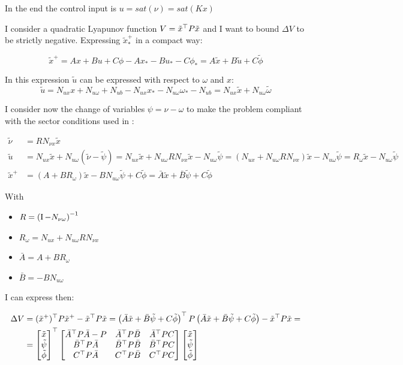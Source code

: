 \documentclass{article}
\begin{document}
In the end the control input is $u = sat(\nu) = sat(K x)$

I consider a quadratic Lyapunov function $V = \tilde{x}^\top P \tilde{x}$ and I want to bound $\Delta V$ to be strictly negative.
Expressing $\tilde{x}_*^{+}$ in a compact way:

$$
  \tilde{x}^{+} = A x + B u + C \phi - A x_* - B u_* - C \phi_* = A \tilde{x} + B \tilde{u} + C \tilde{\phi}
$$

In this expression $\tilde{u}$ can be expressed with respect to $\omega$ and $x$:
$$
  \tilde{u} = N_{ux} x + N_{u \omega} + N_{ub} - N_{ux} x_* - N_{u \omega} \omega_* - N_{ub} = N_{ux} \tilde{x} + N_{u \omega} \tilde{\omega}
$$

I consider now the change of variables $\psi = \nu - \omega$ to make the problem compliant with the sector conditions used in \cite{css-extended}:

\begin{align*}
  \tilde{\nu} &= R N_{\nu x} \tilde{x} \\
  \tilde{u} &= N_{ux} \tilde{x} + N_{u \omega} (\tilde{\nu} - \tilde{\psi}) = N_{ux} \tilde{x} + N_{u \omega} R N_{\nu x} \tilde{x} - N_{u \omega} \tilde{\psi} = (N_{ux} + N_{u \omega} R N_{\nu x}) \tilde{x} - N_{u \omega} \tilde{\psi} = R_{\omega} \tilde{x} - N_{u \omega} \tilde{\psi} \\
  \tilde{x}^{+} &= (A + B R_{\omega}) \tilde{x} - B N_{u \omega} \tilde{\psi} + C \tilde{\phi} = \bar{A} \tilde{x} + \bar{B} \tilde{\psi} + C \tilde{\phi}
\end{align*}

With \begin{itemize}
  \item $R = \left( \operatorname{I} - N_{\nu \omega} \right)^{-1}$
  \item $R_{\omega} = N_{ux} + N_{u \omega} R N_{\nu x}$
  \item $\bar{A} = A + B R_{\omega}$
  \item $\bar{B} = - B N_{u \omega}$
\end{itemize}

I can express then:

\begin{align*}
  \Delta V &= (\tilde{x}^{+})^\top P \tilde{x}^{+} - \tilde{x}^\top P \tilde{x} = \left( \bar{A} \tilde{x} + \bar{B} \tilde{\psi} + C \tilde{\phi} \right)^\top P \left( \bar{A} \tilde{x} + \bar{B} \tilde{\psi} + C \tilde{\phi} \right) - \tilde{x}^\top P \tilde{x} = \\
  &= \left[\begin{matrix}
    \tilde{x}\\
    \tilde{\psi}\\
    \tilde{\phi}
  \end{matrix}\right]^\top \left[\begin{matrix}
    \bar{A}^\top P \bar{A} - P & \bar{A}^\top P \bar{B} & \bar{A}^\top P C \\
    \bar{B}^\top P \bar{A} & \bar{B}^\top P \bar{B} & \bar{B}^\top P C \\
    C^\top P \bar{A} & C^\top P \bar{B} & C^\top P C
  \end{matrix}\right] \left[\begin{matrix}
    \tilde{x}\\
    \tilde{\psi}\\
    \tilde{\phi}
  \end{matrix}\right]
\end{align*}
\end{document}
